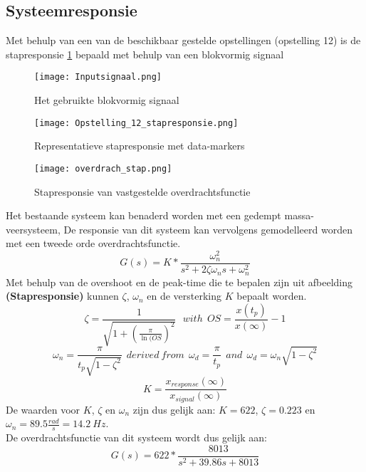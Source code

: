 \documentclass[a4paper]{article}
\begin{document}
\newpage
\subsection{Systeemresponsie}
Met behulp van een van de beschikbaar gestelde opstellingen (opstelling 12) is de stapresponsie \ref{stapresponsie} bepaald met behulp van een blokvormig signaal
\begin{figure}[h]
  \centering
    \texttt{[image: Inputsignaal.png]}
    \caption{Het gebruikte blokvormig signaal}
\end{figure}

\begin{figure}[h]
\label{stapresponsie}
  \centering
    \texttt{[image: Opstelling\_12\_stapresponsie.png]}
    \caption{Representatieve stapresponsie met data-markers}
\end{figure}

\begin{figure}[h]
\label{overdrachtres}
  \centering
   \texttt{[image: overdrach\_stap.png]}
    \caption{Stapresponsie van vastgestelde overdrachtsfunctie}
\end{figure}

Het bestaande systeem kan benaderd worden met een gedempt massa-veersysteem, De responsie van dit systeem kan vervolgens gemodelleerd worden met een tweede orde overdrachtsfunctie. 
\begin{equation}
G(s) = K * \frac{\omega_n^2}{s^2 + 2 \zeta \omega_n s + \omega_n^2}
\end{equation}
Met behulp van de overshoot en de peak-time die te bepalen zijn uit afbeelding \textbf{(Stapresponsie)} kunnen $\zeta$, $\omega_n$ en de versterking $K$ bepaalt worden.
\begin{equation}
\zeta = \frac{1}{\sqrt{1 + (\frac{\pi}{\ln(OS})^2}} \ \ \ with \ \ OS = \frac{x(t_p)}{x(\infty)} -1
\end{equation}
\begin{equation}
\omega_n = \frac{\pi}{t_p \sqrt{1 - \zeta^2}} \ \ derived \ from \ \ \omega_d = \frac{\pi}{t_p} \ \ and \ \ \omega_d = \omega_n \sqrt{1-\zeta^2}
\end{equation}
\begin{equation}
K = \frac{x_{response}(\infty)}{x_{signal}(\infty)}
\end{equation}
De waarden voor $K$, $\zeta$ en $\omega_n$ zijn dus gelijk aan: $ K = 622$, 
$\zeta = 0.223$ en $\omega_n = 89.5 \frac{rad}{s} = 14.2 \ Hz$.\\
De overdrachtsfunctie van dit systeem wordt dus gelijk aan:
\begin{equation}
G(s) = 622 * \frac{8013}{s^2 + 39.86 s + 8013}
\end{equation}
\end{document}
